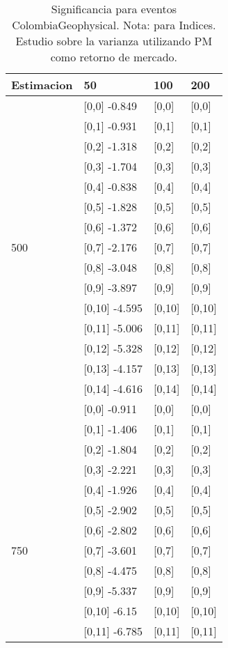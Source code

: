 \begin{table}

\caption{Significancia para eventos ColombiaGeophysical. Nota: para Indices. Estudio sobre la varianza utilizando PM como retorno de mercado.}
\centering
\begin{tabular}[t]{llll}
\toprule
Estimacion & 50 & 100 & 200\\
\midrule
 & {}[0,0] -0.849 & {}[0,0] & {}[0,0]\\
 & {}[0,1] -0.931 & {}[0,1] & {}[0,1]\\
 & {}[0,2] -1.318 & {}[0,2] & {}[0,2]\\
 & {}[0,3] -1.704 & {}[0,3] & {}[0,3]\\
 & {}[0,4] -0.838 & {}[0,4] & {}[0,4]\\
\addlinespace
 & {}[0,5] -1.828 & {}[0,5] & {}[0,5]\\
 & {}[0,6] -1.372 & {}[0,6] & {}[0,6]\\
500 & {}[0,7] -2.176 & {}[0,7] & {}[0,7]\\
 & {}[0,8] -3.048 & {}[0,8] & {}[0,8]\\
 & {}[0,9] -3.897 & {}[0,9] & {}[0,9]\\
\addlinespace
 & {}[0,10] -4.595 & {}[0,10] & {}[0,10]\\
 & {}[0,11] -5.006 & {}[0,11] & {}[0,11]\\
 & {}[0,12] -5.328 & {}[0,12] & {}[0,12]\\
 & {}[0,13] -4.157 & {}[0,13] & {}[0,13]\\
 & {}[0,14] -4.616 & {}[0,14] & {}[0,14]\\
\addlinespace
 & {}[0,0] -0.911 & {}[0,0] & {}[0,0]\\
 & {}[0,1] -1.406 & {}[0,1] & {}[0,1]\\
 & {}[0,2] -1.804 & {}[0,2] & {}[0,2]\\
 & {}[0,3] -2.221 & {}[0,3] & {}[0,3]\\
 & {}[0,4] -1.926 & {}[0,4] & {}[0,4]\\
\addlinespace
 & {}[0,5] -2.902 & {}[0,5] & {}[0,5]\\
 & {}[0,6] -2.802 & {}[0,6] & {}[0,6]\\
750 & {}[0,7] -3.601 & {}[0,7] & {}[0,7]\\
 & {}[0,8] -4.475 & {}[0,8] & {}[0,8]\\
 & {}[0,9] -5.337 & {}[0,9] & {}[0,9]\\
\addlinespace
 & {}[0,10] -6.15 & {}[0,10] & {}[0,10]\\
 & {}[0,11] -6.785 & {}[0,11] & {}[0,11]\\

\end{tabular}
\end{table}
